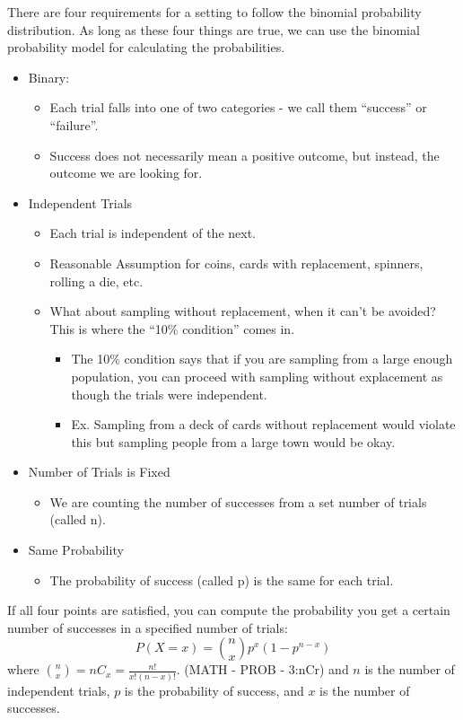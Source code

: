 \documentclass[../stats.tex]{subfiles}
\begin{document}
There are four requirements for a setting to follow the binomial probability distribution. As long as these four things are true, we can use the binomial probability model for calculating the probabilities.
\begin{itemize}
    \item Binary:
    \begin{itemize}
        \item Each trial falls into one of two categories - we call them ``success'' or ``failure''.
        \item Success does not necessarily mean a positive outcome, but instead, the outcome we are looking for.
    \end{itemize}
    \item Independent Trials
    \begin{itemize}
        \item Each trial is independent of the next.
        \item Reasonable Assumption for coins, cards with replacement, spinners, rolling a die, etc.
        \item What about sampling without replacement, when it can't be avoided? This is where the ``10\% condition'' comes in.
        \begin{itemize}
            \item The 10\% condition says that if you are sampling from a large enough population, you can proceed with sampling without explacement as though the trials were independent.
            \item Ex. Sampling from a deck of cards without replacement would violate this but sampling people from a large town would be okay.
        \end{itemize}
    \end{itemize}
    \item Number of Trials is Fixed 
    \begin{itemize}
        \item We are counting the number of successes from a set number of trials (called n).
    \end{itemize}
    \item Same Probability
    \begin{itemize}
        \item The probability of success (called p) is the same for each trial.
    \end{itemize}
\end{itemize}

If all four points are satisfied, you can compute the probability you get a certain number of successes in a specified number of trials:
\[ P(X=x)=\binom{n}{x}p^x(1-p^{n-x})\] 
where $\binom{n}{x}=nC_x=\frac{n!}{x!(n-x)!}$. (MATH - PROB - 3:nCr) and $n$ is the number of independent trials, $p$ is the probability of success, and $x$ is the number of successes.
\end{document}
